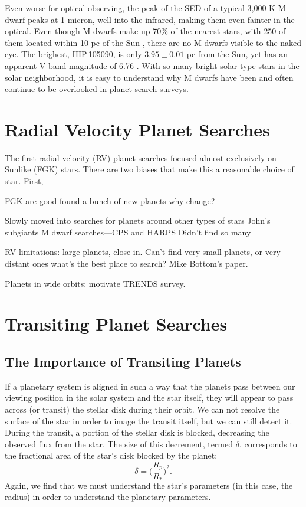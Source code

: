 \documentclass[12pt]{caltech_thesis}
\begin{document}
Even worse for optical observing,
the peak of the SED of a typical 3,000 K M dwarf peaks at 1 micron, well into the infrared, making them even fainter in the optical.
Even though M dwarfs make up 70\% of the nearest stars, with 250 of them located within
10 pc of the Sun \citep[e.g.][]{Henry06}, there are no M dwarfs visible to the naked 
eye.
The brighest, HIP\,105090, is only $3.95 \pm 0.01$ pc from the Sun, yet has an apparent V-band magnitude of 6.76 \citep{vanLeeuwen07}.
With so many bright solar-type stars in the solar neighborhood, it is easy to understand why M dwarfs have been and often continue to be overlooked in planet search
surveys. 

\section{Radial Velocity Planet Searches}
The first radial velocity (RV) planet searches focused almost exclusively on Sunlike
(FGK) stars. 
There are two biases that make this a reasonable choice of star. 
First, 

FGK are good
found a bunch of new planets
why change?

Slowly moved into searches for planets around other types of stars
John's subgiants
M dwarf searches---CPS and HARPS
Didn't find so many

RV limitations: large planets, close in.
Can't find very small planets, or very distant ones
what's the best place to search? Mike Bottom's paper.

Planets in wide orbits: motivate TRENDS survey.

\section{Transiting Planet Searches}
\subsection{The Importance of Transiting Planets}
If a planetary system is aligned in such a way that the planets pass between our
viewing position in the solar system and the star itself, they will appear to pass
across (or transit) the stellar disk during their orbit.
We can not resolve the surface of the star in order to image the transit itself, but
we can still detect it. 
During the transit, a portion of the stellar disk is blocked, decreasing the observed
flux from the star. 
The size of this decrement, termed $\delta$, corresponds to the fractional area of the star's disk blocked by the planet:
\begin{equation}
\delta = \bigg(\frac{R_p}{R_*}\bigg)^2.
\end{equation}
Again, we find that we must understand the star's parameters (in this case, the radius)
in order to understand the planetary parameters.
\end{document}
